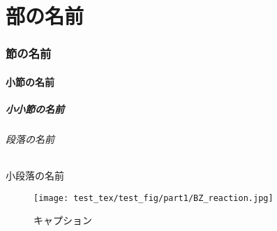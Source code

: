 \documentclass[autodetect-engine,dvipdfmx-if-dvi,ja=standard,a4paper,12pt]{bxjsbook}
\begin{document}
\part{部の名前}
\section{節の名前}
\subsection{小節の名前}
\subsubsection{小小節の名前}
\paragraph{段落の名前}
\subparagraph{小段落の名前}

\begin{figure}[htb]
  \centering
  \texttt{[image: test\_tex/test\_fig/part1/BZ\_reaction.jpg]}
  \caption{キャプション}
  \label{fig:test}
\end{figure}
\end{document}
